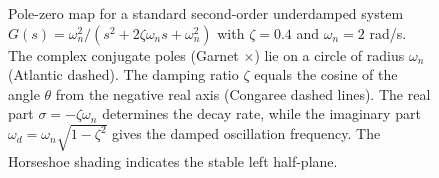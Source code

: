 \begin{figure}[htbp]
\caption{Pole-zero map for a standard second-order underdamped system $G(s) = \omega_n^2/(s^2 + 2\zeta\omega_n s + \omega_n^2)$ with $\zeta = 0.4$ and $\omega_n = 2$ rad/s. The complex conjugate poles (Garnet $\times$) lie on a circle of radius $\omega_n$ (Atlantic dashed). The damping ratio $\zeta$ equals the cosine of the angle $\theta$ from the negative real axis (Congaree dashed lines). The real part $\sigma = -\zeta\omega_n$ determines the decay rate, while the imaginary part $\omega_d = \omega_n\sqrt{1-\zeta^2}$ gives the damped oscillation frequency. The Horseshoe shading indicates the stable left half-plane.}
\label{fig:pole_zero_map}
\end{figure}
